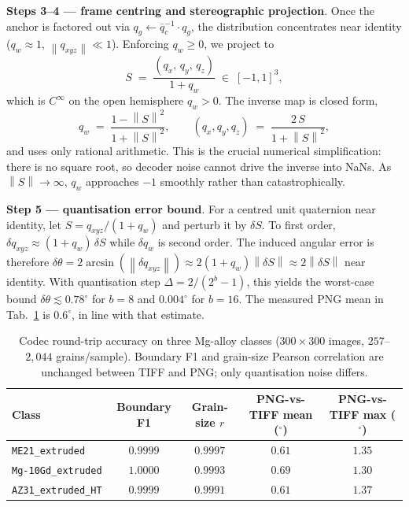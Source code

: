 \documentclass{article}
\newcommand{\norm}[1]{\left\lVert#1\right\rVert}
\begin{document}
\textbf{Steps 3--4 --- frame centring and stereographic projection}. Once the anchor is factored out via $q_g \leftarrow \bar q_c^{-1}\cdot q_g$, the distribution concentrates near identity ($q_w\approx 1$, $\norm{q_{xyz}}\ll 1$). Enforcing $q_w\ge 0$, we project to
\begin{equation}
  S \;=\; \frac{(q_x,\, q_y,\, q_z)}{1 + q_w} \;\in\; [-1, 1]^3,
  \label{eq:stereo}
\end{equation}
which is $C^\infty$ on the open hemisphere $q_w>0$. The inverse map is closed form,
\begin{equation}
  q_w \;=\; \frac{1 - \norm{S}^2}{1 + \norm{S}^2}, \qquad
  (q_x, q_y, q_z) \;=\; \frac{2\, S}{1 + \norm{S}^2},
  \label{eq:istereo}
\end{equation}
and uses only rational arithmetic. This is the crucial numerical simplification: there is no square root, so decoder noise cannot drive the inverse into NaNs. As $\norm{S}\to\infty$, $q_w$ approaches $-1$ smoothly rather than catastrophically.

\textbf{Step 5 --- quantisation error bound}. For a centred unit quaternion near identity, let $S=q_{xyz}/(1+q_w)$ and perturb it by $\delta S$. To first order, $\delta q_{xyz}\approx (1+q_w)\,\delta S$ while $\delta q_w$ is second order. The induced angular error is therefore $\delta\theta = 2\arcsin(\norm{\delta q_{xyz}}) \approx 2(1+q_w)\norm{\delta S} \approx 2\norm{\delta S}$ near identity. With quantisation step $\Delta = 2/(2^b{-}1)$, this yields the worst-case bound $\delta\theta \lesssim 0.78^\circ$ for $b{=}8$ and $0.004^\circ$ for $b{=}16$. The measured PNG mean in Tab.~\ref{tab:codec-accuracy} is $0.6^\circ$, in line with that estimate.

\begin{table}[!ht]
  \caption{Codec round-trip accuracy on three Mg-alloy classes ($300{\times}300$ images, $257$--$2{,}044$ grains/sample). Boundary F1 and grain-size Pearson correlation are unchanged between TIFF and PNG; only quantisation noise differs.}
  \label{tab:codec-accuracy}
  \centering
  \small
  \begin{tabular}{lcccc}
    \toprule
    Class & Boundary F1 & Grain-size $r$ & PNG-vs-TIFF mean ($^\circ$) & PNG-vs-TIFF max ($^\circ$) \\
    \midrule
    \texttt{ME21\_extruded}    & $0.9999$ & $0.9997$ & $0.61$ & $1.35$ \\
    \texttt{Mg{-}10Gd\_extruded} & $1.0000$ & $0.9993$ & $0.69$ & $1.30$ \\
    \texttt{AZ31\_extruded\_HT} & $0.9999$ & $0.9991$ & $0.61$ & $1.37$ \\
    \bottomrule
  \end{tabular}
\end{table}
\end{document}
